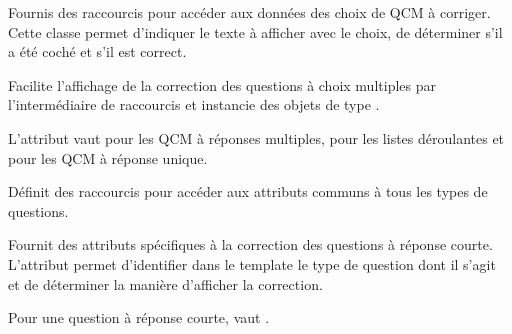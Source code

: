 \documentclass[a4paper,11pt,openany,oneside]{sphinxmanual}
\begin{document}
\begin{fulllineitems}
\label{source:quiz.utils.correct.CorrectChoice}
Fournis des raccourcis pour accéder aux données des choix de QCM à corriger.
Cette classe permet d'indiquer le texte à afficher avec le choix, de déterminer
s'il a été coché et s'il est correct.

\end{fulllineitems}


\begin{fulllineitems}
\label{source:quiz.utils.correct.CorrectQcm}
Facilite l'affichage de la correction des questions à choix multiples par
l'intermédiaire de raccourcis et instancie des objets de type {\hyperref[source:quiz.utils.correct.CorrectChoice]{\emph{}}}.

L'attribut  vaut  pour les QCM à réponses multiples,  pour
les listes déroulantes et  pour les QCM à réponse unique.

\end{fulllineitems}


\begin{fulllineitems}
\label{source:quiz.utils.correct.CorrectQuestion}
Définit des raccourcis pour accéder aux attributs communs à tous les types
de questions.

\end{fulllineitems}


\begin{fulllineitems}
\label{source:quiz.utils.correct.CorrectSq}
Fournit des attributs spécifiques à la correction des questions à réponse courte.
L'attribut  permet d'identifier dans le template le type de question
dont il s'agit et de déterminer la manière d'afficher la correction.

Pour une question à réponse courte,  vaut .

\end{fulllineitems}
\end{document}
